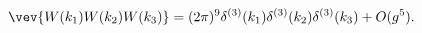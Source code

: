\begin{equation}
  \vev{W(k_1)W(k_2)W(k_3)}
  = (2 \pi)^9 \delta^{(3)}(k_1) \delta^{(3)}(k_2)
              \delta^{(3)}(k_3) + O(g^5).
\end{equation}

